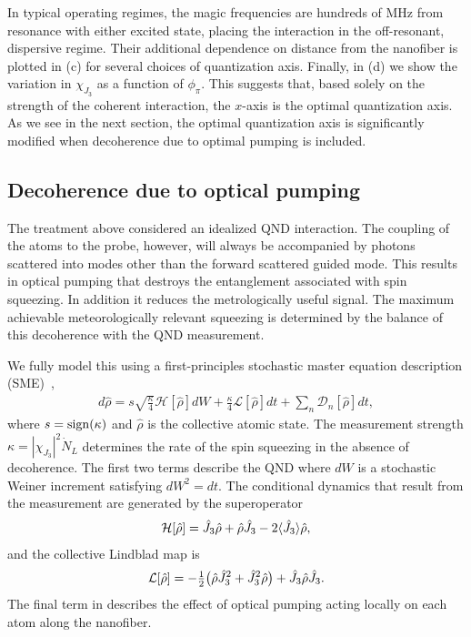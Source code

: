 \documentclass[preprint, aps,pra,onecolumn]{revtex4-1} %
\newcommand{\jz}{\hat{J}_3}
\newcommand{\chieff}{\chi_{J_3}}
\begin{document}
In typical operating regimes, the magic frequencies are hundreds of MHz from resonance with either excited state, placing the interaction in the off-resonant, dispersive regime.  
Their additional dependence on distance from the nanofiber is plotted in (c) for several choices of quantization axis.  
Finally, in (d) we show the variation in $\chieff$ as a function of $\phi_\pi$.  
This suggests that, based solely on the strength of the coherent interaction, the $x$-axis is the optimal quantization axis. 
As we see in the next section, the optimal quantization axis is significantly modified when decoherence due to optimal pumping is included.


	\subsection{Decoherence due to optical pumping}
	
The treatment above considered an idealized QND interaction. The coupling of the atoms to the probe, however, will always be accompanied by photons scattered into modes other than the forward scattered guided mode.  This results in optical pumping that destroys the entanglement associated with spin squeezing.  In addition it reduces the metrologically useful signal.  
The maximum achievable meteorologically relevant squeezing is determined by the balance of this decoherence with the QND measurement. 

We fully model this using a first-principles stochastic master equation description (SME)~\cite{jacobs_straightforward_2006, baragiola_three-dimensional_2014},
	\begin{align} \label{Eq::SME}
		d \hat{\rho} = s\sqrt{\frac{\kappa}{4}} \mathcal{H}[\hat{\rho}] dW + \frac{\kappa}{4} \mathcal{L}[\hat{\rho}] dt + \sum_n \mathcal{D}_n [\hat{\rho}] dt,
	\end{align}
where $s = {\rm sign}(\kappa)$ and $\hat{\rho}$ is the collective atomic state. 
The measurement strength $\kappa =|\chieff|^2 \dot{N}_L$ determines the rate of the spin squeezing in the absence of decoherence.  
The first two terms describe the QND where $dW$ is a stochastic Weiner increment satisfying $dW^2 = dt$. 
The conditional dynamics that result from the measurement are generated by the superoperator
	\begin{align}
		\mathcal{H}[\hat{\rho}] = \jz \hat{\rho} + \hat{\rho} \jz - 2 \expt{\jz} \hat{\rho},
	\end{align}
and the collective Lindblad map is
	\begin{align}
		\mathcal{L}[\hat{\rho}] = - \smallfrac{1}{2} \big( \hat{\rho}  \jz^2 + \jz^2 \hat{\rho} \big) + \jz \hat{\rho} \jz.
	\end{align}
The final term in  describes the effect of optical pumping acting locally on each atom along the nanofiber. 
\end{document}
